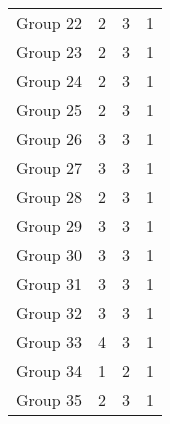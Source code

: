 \begin{table}[H]
\begin{tabular}{@{}rccc@{}}
        Group 22 & 2                                         & 3                                          & 1                                      \\
        Group 23 & 2                                         & 3                                          & 1                                      \\
        Group 24 & 2                                         & 3                                          & 1                                      \\
        Group 25 & 2                                         & 3                                          & 1                                      \\
        Group 26 & 3                                         & 3                                          & 1                                      \\
        Group 27 & 3                                         & 3                                          & 1                                      \\
        Group 28 & 2                                         & 3                                          & 1                                      \\
        Group 29 & 3                                         & 3                                          & 1                                      \\
        Group 30 & 3                                         & 3                                          & 1                                      \\
        Group 31 & 3                                         & 3                                          & 1                                      \\
        Group 32 & 3                                         & 3                                          & 1                                      \\
        Group 33 & 4                                         & 3                                          & 1                                      \\
        Group 34 & 1                                         & 2                                          & 1                                      \\
        Group 35 & 2                                         & 3                                          & 1                                      \\

\end{tabular}
\end{table}

